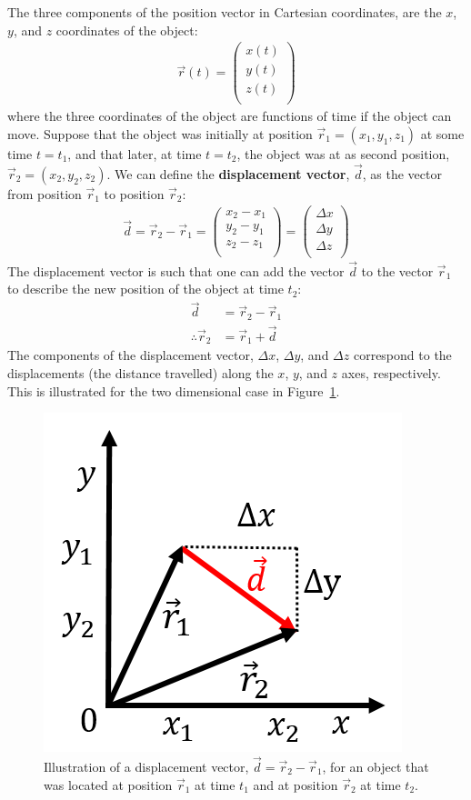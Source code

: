 The three components of the position vector in Cartesian coordinates, are the $x$, $y$, and $z$ coordinates of the object:
\begin{align*}
\vec r(t) = \begin{pmatrix}
           x(t) \\
           y(t) \\
           z(t) \\
         \end{pmatrix}
\end{align*}
where the three coordinates of the object are functions of time if the object can move. Suppose that the object was initially at position $\vec r_1=(x_1, y_1, z_1)$ at some time $t=t_1$, and that later, at time $t=t_2$, the object was at as second position, $\vec r_2=(x_2, y_2, z_2)$. We can define the \textbf{displacement vector}, $\vec  d$, as the vector from position $\vec r_1$ to position $\vec r_2$:
\begin{align*}
 \vec d = \vec r_2 - \vec r_1 =\begin{pmatrix}
           x_2-x_1 \\
           y_2-y_1 \\
           z_2-z_1 \\
         \end{pmatrix} = \begin{pmatrix}
           \Delta x \\
           \Delta y \\
           \Delta z \\
         \end{pmatrix}
\end{align*}
The displacement vector is such that one can add the vector $\vec d$ to the vector $\vec r_1$ to describe the new position of the object at time $t_2$:
\begin{align*}
\vec d &= \vec r_2 - \vec r_1\\
\therefore \vec r_2 &= \vec r_1 + \vec d
\end{align*}
The components of the displacement vector, $\Delta x$, $\Delta y$, and $\Delta z$ correspond to the displacements (the distance travelled) along the $x$, $y$, and $z$ axes, respectively. This is illustrated for the two dimensional case in Figure~\ref{fig:Vectors:xydvec}.

\begin{figure}[!htbp]
\centering
\includegraphics[width=0.375\linewidth]{files/xydvec-47b3c4d0a25582caecba219c976e060e.png}
\caption[]{Illustration of a displacement vector, $\vec d = \vec r_2 -\vec r_1$, for an object that was located at position $\vec r_1$ at time $t_1$ and at position $\vec r_2$ at time $t_2$.}
\label{fig:Vectors:xydvec}
\end{figure}

